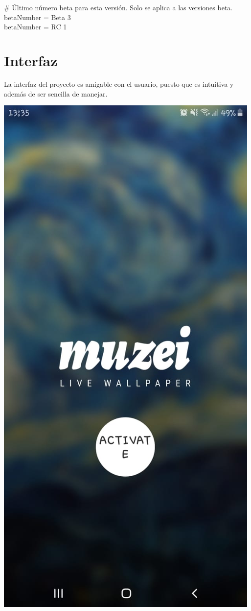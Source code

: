 \documentclass[12pt,a4paper]{article}
\begin{document}
{# Último número beta para esta versión. Solo se aplica a las versiones beta.\\
betaNumber = Beta 3\\
betaNumber = RC 1\\

\section{Interfaz}
La interfaz del proyecto es amigable con el usuario, puesto que es intuitiva y además de ser sencilla de manejar.\\

\begin{Interfaz}
\centering
\includegraphics[scale=0.2]{Interfaz.jpeg}
\end{Interfaz}
\\
\\

}
\end{document}
